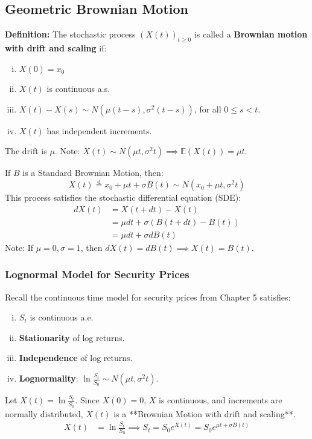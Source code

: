 \subsection{Geometric Brownian Motion}
\begin{framed}
\textbf{Definition: } The stochastic process \((X(t))_{t \ge 0}\) is called a \textbf{Brownian motion with drift and scaling} if:
\begin{enumerate}[i.]
    \item \(X(0) = x_0\)
    \item \(X(t)\) is continuous a.s.
    \item \(X(t) - X(s) \sim N(\mu(t-s),\sigma^2(t-s))\), for all \(0 \leq s < t\).
    \item \(X(t)\) has independent increments.
\end{enumerate}
The drift is \(\mu\). Note: \(X(t) \sim N(\mu t, \sigma^2 t) \implies \mathbb{E}(X(t)) = \mu t\).
\end{framed}

If \(B\) is a Standard Brownian Motion, then:
\begin{equation*}
    X(t) \stackrel{\text{d}}{=} x_0 + \mu t + \sigma B(t) \sim N(x_0 + \mu t, \sigma^2 t)
\end{equation*}
This process satisfies the stochastic differential equation (SDE):
\begin{align*}
    dX(t) &= X(t+dt) - X(t) \\
    &= \mu dt + \sigma (B(t+dt) - B(t)) \\
    &= \boxed{\mu dt + \sigma dB(t)}
\end{align*}
Note: If \(\mu = 0, \sigma = 1\), then \(dX(t) = dB(t) \implies X(t) = B(t)\).

\subsubsection{Lognormal Model for Security Prices}
Recall the continuous time model for security prices from Chapter 5 satisfies:
\begin{enumerate}[i.]
    \item \(S_t\) is continuous a.e.
    \item \textbf{Stationarity} of log returns.
    \item \textbf{Independence} of log returns.
    \item \textbf{Lognormality}: \(\ln \frac{S_t}{S_0} \sim N(\mu t, \sigma^2t)\).
\end{enumerate}
Let \(X(t) = \ln \frac{S_t}{S_0}\). Since \(X(0)=0\), $X$ is continuous, and increments are normally distributed, \(X(t)\) is a **Brownian Motion with drift and scaling**.
\begin{align*}
    X(t) &= \ln \frac{S_t}{S_0} \implies S_t = S_0e^{X(t)} = S_0e^{\mu t + \sigma B(t)}
\end{align*}

